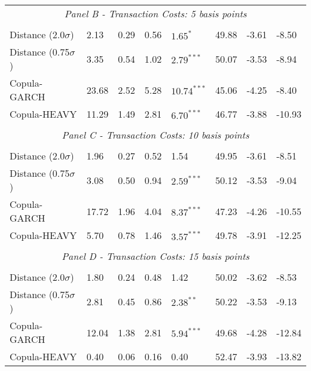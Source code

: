 \documentclass[a4paper,12pt]{report}
\begin{document}
\begin{refsection}
\begin{threeparttable}[H]
\begin{tabularx}{\textwidth}{@{\extracolsep{\fill}}llllllll@{}}
		\multicolumn{8}{c}{\textit{Panel B - Transaction Costs: 5 basis points}} \\
		&       &       &       &       &       &       &  \\
		Distance (2.0$\sigma$) & 2.13  & 0.29  & 0.56  & $1.65^{*}$  & 49.88 & -3.61  & -8.50 \\
		Distance (0.75$\sigma$) & 3.35  & 0.54  & 1.02  & $2.79^{***}$  & 50.07 & -3.53  & -8.94 \\
		Copula-GARCH & 23.68 & 2.52  & 5.28  & $10.74^{***}$ & 45.06 & -4.25  & -8.40 \\
		Copula-HEAVY & 11.29 & 1.49  & 2.81  & $6.70^{***}$  & 46.77 & -3.88  & -10.93 \\
		\multicolumn{1}{r}{} & \multicolumn{1}{r}{} & \multicolumn{1}{r}{} & \multicolumn{1}{r}{} & \multicolumn{1}{r}{} & \multicolumn{1}{r}{} & \multicolumn{1}{r}{} & \multicolumn{1}{r}{} \\
		\multicolumn{8}{c}{\textit{Panel C - Transaction Costs: 10 basis points}} \\
		&       &       &       &       &       &       &  \\
		Distance (2.0$\sigma$) & 1.96  & 0.27  & 0.52  & 1.54  & 49.95 & -3.61  & -8.51 \\
		Distance (0.75$\sigma$) & 3.08  & 0.50  & 0.94  & $2.59^{***}$  & 50.12 & -3.53  & -9.04 \\
		Copula-GARCH & 17.72 & 1.96  & 4.04  & $8.37^{***}$  & 47.23 & -4.26  & -10.55 \\
		Copula-HEAVY & 5.70  & 0.78  & 1.46  & $3.57^{***}$  & 49.78 & -3.91  & -12.25 \\
		\multicolumn{1}{r}{} & \multicolumn{1}{r}{} & \multicolumn{1}{r}{} & \multicolumn{1}{r}{} & \multicolumn{1}{r}{} & \multicolumn{1}{r}{} & \multicolumn{1}{r}{} & \multicolumn{1}{r}{} \\
		\multicolumn{8}{c}{\textit{Panel D - Transaction Costs: 15 basis points}} \\
		&       &       &       &       &       &       &  \\
		Distance (2.0$\sigma$) & 1.80  & 0.24  & 0.48  & 1.42  & 50.02 & -3.62  & -8.53 \\
		Distance (0.75$\sigma$) & 2.81  & 0.45  & 0.86  & $2.38^{**}$  & 50.22 & -3.53  & -9.13 \\
		Copula-GARCH & 12.04 & 1.38  & 2.81  & $5.94^{***}$  & 49.68 & -4.28  & -12.84 \\
		Copula-HEAVY & 0.40  & 0.06  & 0.16  & 0.40  & 52.47 & -3.93  & -13.82 \\

\end{tabularx}
\end{threeparttable}
\end{refsection}
\end{document}
